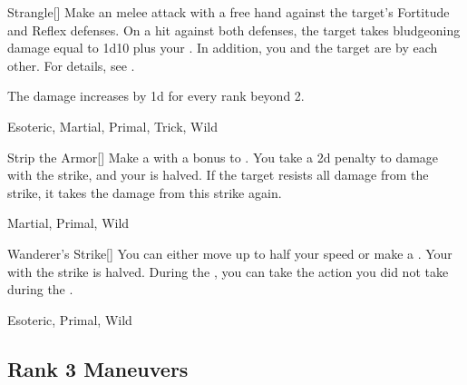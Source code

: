 \lowercase{\hypertarget{maneuver:Strangle}{}}\label{maneuver:Strangle}
\hypertarget{maneuver:Strangle}{}
\begin{freeability}[Rank 2]{Strangle}[]
Make an melee attack with a free hand against the target's Fortitude and Reflex defenses.
On a hit against both defenses, the target takes bludgeoning damage equal to 1d10 plus your .
In addition, you and the target are  by each other.
For details, see .

\rankline
The damage increases by \plus1d for every rank beyond 2.


 Esoteric, Martial, Primal, Trick, Wild
\end{freeability}
\vspace{0.25em}



\lowercase{\hypertarget{maneuver:Strip the Armor}{}}\label{maneuver:Strip the Armor}
\hypertarget{maneuver:Strip the Armor}{}
\begin{freeability}[Rank 2]{Strip the Armor}[]
Make a  with a  bonus to .
You take a \minus2d penalty to damage with the strike, and your  is halved.
If the target resists all damage from the strike, it takes the damage from this strike again.


 Martial, Primal, Wild
\end{freeability}
\vspace{0.25em}



\lowercase{\hypertarget{maneuver:Wanderer's Strike}{}}\label{maneuver:Wanderer's Strike}
\hypertarget{maneuver:Wanderer's Strike}{}
\begin{freeability}[Rank 2]{Wanderer's Strike}[]
You can either move up to half your speed or make a .
Your  with the strike is halved.
During the , you can take the action you did not take during the .


 Esoteric, Primal, Wild
\end{freeability}
\vspace{0.25em}


\subsection{Rank 3 Maneuvers}

